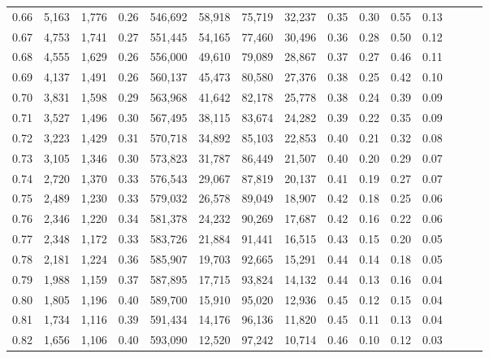 \begin{tabular}{rrrrrrrrrrrrrrr}
0.66 &   5,163 &  1,776 &  0.26 &  546,692 &   58,918 &   75,719 &   32,237 &  0.35 &  0.30 &  0.55 &      0.13 \\
0.67 &   4,753 &  1,741 &  0.27 &  551,445 &   54,165 &   77,460 &   30,496 &  0.36 &  0.28 &  0.50 &      0.12 \\
0.68 &   4,555 &  1,629 &  0.26 &  556,000 &   49,610 &   79,089 &   28,867 &  0.37 &  0.27 &  0.46 &      0.11 \\
0.69 &   4,137 &  1,491 &  0.26 &  560,137 &   45,473 &   80,580 &   27,376 &  0.38 &  0.25 &  0.42 &      0.10 \\
0.70 &   3,831 &  1,598 &  0.29 &  563,968 &   41,642 &   82,178 &   25,778 &  0.38 &  0.24 &  0.39 &      0.09 \\
0.71 &   3,527 &  1,496 &  0.30 &  567,495 &   38,115 &   83,674 &   24,282 &  0.39 &  0.22 &  0.35 &      0.09 \\
0.72 &   3,223 &  1,429 &  0.31 &  570,718 &   34,892 &   85,103 &   22,853 &  0.40 &  0.21 &  0.32 &      0.08 \\
0.73 &   3,105 &  1,346 &  0.30 &  573,823 &   31,787 &   86,449 &   21,507 &  0.40 &  0.20 &  0.29 &      0.07 \\
0.74 &   2,720 &  1,370 &  0.33 &  576,543 &   29,067 &   87,819 &   20,137 &  0.41 &  0.19 &  0.27 &      0.07 \\
0.75 &   2,489 &  1,230 &  0.33 &  579,032 &   26,578 &   89,049 &   18,907 &  0.42 &  0.18 &  0.25 &      0.06 \\
0.76 &   2,346 &  1,220 &  0.34 &  581,378 &   24,232 &   90,269 &   17,687 &  0.42 &  0.16 &  0.22 &      0.06 \\
0.77 &   2,348 &  1,172 &  0.33 &  583,726 &   21,884 &   91,441 &   16,515 &  0.43 &  0.15 &  0.20 &      0.05 \\
0.78 &   2,181 &  1,224 &  0.36 &  585,907 &   19,703 &   92,665 &   15,291 &  0.44 &  0.14 &  0.18 &      0.05 \\
0.79 &   1,988 &  1,159 &  0.37 &  587,895 &   17,715 &   93,824 &   14,132 &  0.44 &  0.13 &  0.16 &      0.04 \\
0.80 &   1,805 &  1,196 &  0.40 &  589,700 &   15,910 &   95,020 &   12,936 &  0.45 &  0.12 &  0.15 &      0.04 \\
0.81 &   1,734 &  1,116 &  0.39 &  591,434 &   14,176 &   96,136 &   11,820 &  0.45 &  0.11 &  0.13 &      0.04 \\
0.82 &   1,656 &  1,106 &  0.40 &  593,090 &   12,520 &   97,242 &   10,714 &  0.46 &  0.10 &  0.12 &      0.03 \\

\end{tabular}
